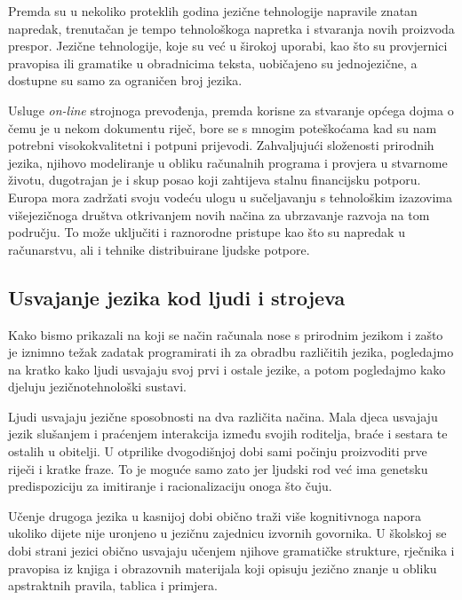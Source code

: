 \begin{multicols}{2}
Premda su u nekoliko proteklih godina jezične tehnologije napravile znatan napredak, trenutačan je tempo tehnološkoga napretka i stvaranja novih proizvoda prespor. Jezične tehnologije, koje su već u širokoj uporabi, kao što su provjernici pravopisa ili gramatike u obradnicima teksta, uobičajeno su jednojezične, a dostupne su samo za ograničen broj jezika.


Usluge \emph{on-line} strojnoga prevođenja, premda korisne za stvaranje općega dojma o čemu je u nekom dokumentu riječ, bore se s mnogim poteškoćama kad su nam potrebni visokokvalitetni i potpuni prijevodi. Zahvaljujući složenosti prirodnih jezika, njihovo modeliranje u obliku računalnih programa i provjera u stvarnome životu, dugotrajan je i skup posao koji zahtijeva stalnu financijsku potporu. Europa mora zadržati svoju vodeću ulogu u sučeljavanju s tehnološkim izazovima višejezičnoga društva otkrivanjem novih načina za ubrzavanje razvoja na tom području. To može uključiti i raznorodne pristupe kao što su napredak u računarstvu, ali i tehnike distribuirane ljudske potpore.

\subsection{Usvajanje jezika kod ljudi i strojeva}

Kako bismo prikazali na koji se način računala nose s prirodnim jezikom i zašto je iznimno težak zadatak programirati ih za obradbu različitih jezika, pogledajmo na kratko kako ljudi usvajaju svoj prvi i ostale jezike, a potom pogledajmo kako djeluju jezičnotehnološki sustavi.

Ljudi usvajaju jezične sposobnosti na dva različita načina. Mala djeca usvajaju jezik slušanjem i praćenjem interakcija između svojih roditelja, braće i sestara te ostalih u obitelji. U otprilike dvogodišnjoj dobi sami počinju proizvoditi prve riječi i kratke fraze. To je moguće samo zato jer ljudski rod već ima genetsku predispoziciju za imitiranje i racionalizaciju onoga što čuju.

Učenje drugoga jezika u kasnijoj dobi obično traži više kognitivnoga napora ukoliko dijete nije uronjeno u jezičnu zajednicu izvornih govornika. U školskoj se dobi strani jezici obično usvajaju učenjem njihove gramatičke strukture, rječnika i pravopisa iz knjiga i obrazovnih materijala koji opisuju jezično znanje u obliku apstraktnih pravila, tablica i primjera.


\end{multicols}
